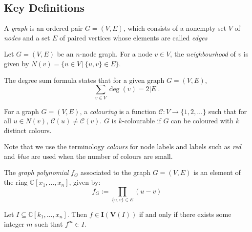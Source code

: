 \documentclass[../main.tex]{subfiles}
\begin{document}
    \subsection*{Key Definitions}
    A \emph{graph} is an ordered pair $G=(V,E)$, which consists of a nonempty set $V$ of \emph{nodes} and a set $E$ of paired vertices whose elements are called \emph{edges} 

    Let $G=(V,E)$ be an $n$-node graph. For a node $v\in V$, the \emph{neighbourhood} of $v$ is given by $N(v)=\{u\in V\, |\, \{u,v\}\in E\}$. 

    \begin{theorem} \label{thm:degreesum}
        The degree sum formula states that for a given graph $G=(V,E)$,
        $$\sum_{v\in V}\deg(v)=2|E|.$$
    \end{theorem}

    \begin{definition}
        For a graph $G=(V,E)$, a \emph{colouring} is a function $\mathcal{C}:V\to \{1,2,\dots\}$ such that for all $u\in N(v)$, $\mathcal{C}(u)\neq\mathcal{C}(v)$. $G$ is $k$-colourable if $G$ can be coloured with $k$ distinct colours. 
    \end{definition}
    



    Note that we use the terminology \emph{colours} for node labels and labels such as \emph{red} and \emph{blue} are used when the number of colours are small.



    \begin{definition}
        The \emph{graph polynomial} $f_G$ associated to the graph $G=(V,E)$ is an element of the ring $\mathbb{C}[x_1,\dots,x_n]$, given by:
        $$f_G := \prod_{\{u,v\}\in E}(u-v)$$
    \end{definition}



    \begin{theorem}
        Let $I\subseteq \mathbb{C}[k_1,\dots,x_n]$. Then $f\in\mathbf{I}(\mathbf{V}(I))$ if and only if there exists some integer $m$ such that $f^m\in I$.
    \end{theorem}

\end{document}
